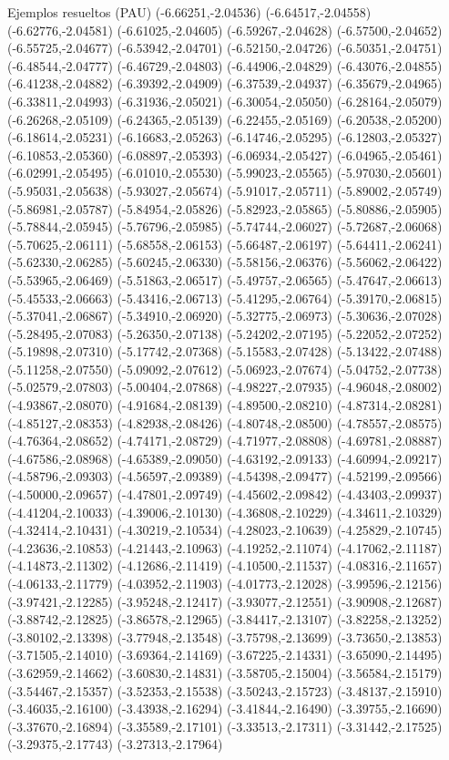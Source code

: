 \documentclass[11pt,a4paper]{article}
\begin{document}
\begin{fmex}{Ejemplos resueltos (PAU)}
(-6.66251,-2.04536) (-6.64517,-2.04558) (-6.62776,-2.04581) (-6.61025,-2.04605) (-6.59267,-2.04628) (-6.57500,-2.04652) (-6.55725,-2.04677) (-6.53942,-2.04701) (-6.52150,-2.04726) (-6.50351,-2.04751) (-6.48544,-2.04777) (-6.46729,-2.04803) (-6.44906,-2.04829) (-6.43076,-2.04855) (-6.41238,-2.04882) (-6.39392,-2.04909) (-6.37539,-2.04937) (-6.35679,-2.04965) (-6.33811,-2.04993) (-6.31936,-2.05021) (-6.30054,-2.05050) (-6.28164,-2.05079) (-6.26268,-2.05109) (-6.24365,-2.05139) (-6.22455,-2.05169) (-6.20538,-2.05200) (-6.18614,-2.05231) (-6.16683,-2.05263) (-6.14746,-2.05295) (-6.12803,-2.05327) (-6.10853,-2.05360) (-6.08897,-2.05393) (-6.06934,-2.05427) (-6.04965,-2.05461) (-6.02991,-2.05495) (-6.01010,-2.05530) (-5.99023,-2.05565) (-5.97030,-2.05601) (-5.95031,-2.05638) (-5.93027,-2.05674) (-5.91017,-2.05711) (-5.89002,-2.05749) (-5.86981,-2.05787) (-5.84954,-2.05826) (-5.82923,-2.05865) (-5.80886,-2.05905) (-5.78844,-2.05945) (-5.76796,-2.05985) (-5.74744,-2.06027) (-5.72687,-2.06068) (-5.70625,-2.06111) (-5.68558,-2.06153) (-5.66487,-2.06197) (-5.64411,-2.06241) (-5.62330,-2.06285) (-5.60245,-2.06330) (-5.58156,-2.06376) (-5.56062,-2.06422) (-5.53965,-2.06469) (-5.51863,-2.06517) (-5.49757,-2.06565) (-5.47647,-2.06613) (-5.45533,-2.06663) (-5.43416,-2.06713) (-5.41295,-2.06764) (-5.39170,-2.06815) (-5.37041,-2.06867) (-5.34910,-2.06920) (-5.32775,-2.06973) (-5.30636,-2.07028) (-5.28495,-2.07083) (-5.26350,-2.07138) (-5.24202,-2.07195) (-5.22052,-2.07252) (-5.19898,-2.07310) (-5.17742,-2.07368) (-5.15583,-2.07428) (-5.13422,-2.07488) (-5.11258,-2.07550) (-5.09092,-2.07612) (-5.06923,-2.07674) (-5.04752,-2.07738) (-5.02579,-2.07803) (-5.00404,-2.07868) (-4.98227,-2.07935) (-4.96048,-2.08002) (-4.93867,-2.08070) (-4.91684,-2.08139) (-4.89500,-2.08210) (-4.87314,-2.08281) (-4.85127,-2.08353) (-4.82938,-2.08426) (-4.80748,-2.08500) (-4.78557,-2.08575) (-4.76364,-2.08652) (-4.74171,-2.08729) (-4.71977,-2.08808) (-4.69781,-2.08887) (-4.67586,-2.08968) (-4.65389,-2.09050) (-4.63192,-2.09133) (-4.60994,-2.09217) (-4.58796,-2.09303) (-4.56597,-2.09389) (-4.54398,-2.09477) (-4.52199,-2.09566) (-4.50000,-2.09657) (-4.47801,-2.09749) (-4.45602,-2.09842) (-4.43403,-2.09937) (-4.41204,-2.10033) (-4.39006,-2.10130) (-4.36808,-2.10229) (-4.34611,-2.10329) (-4.32414,-2.10431) (-4.30219,-2.10534) (-4.28023,-2.10639) (-4.25829,-2.10745) (-4.23636,-2.10853) (-4.21443,-2.10963) (-4.19252,-2.11074) (-4.17062,-2.11187) (-4.14873,-2.11302) (-4.12686,-2.11419) (-4.10500,-2.11537) (-4.08316,-2.11657) (-4.06133,-2.11779) (-4.03952,-2.11903) (-4.01773,-2.12028) (-3.99596,-2.12156) (-3.97421,-2.12285) (-3.95248,-2.12417) (-3.93077,-2.12551) (-3.90908,-2.12687) (-3.88742,-2.12825) (-3.86578,-2.12965) (-3.84417,-2.13107) (-3.82258,-2.13252) (-3.80102,-2.13398) (-3.77948,-2.13548) (-3.75798,-2.13699) (-3.73650,-2.13853) (-3.71505,-2.14010) (-3.69364,-2.14169) (-3.67225,-2.14331) (-3.65090,-2.14495) (-3.62959,-2.14662) (-3.60830,-2.14831) (-3.58705,-2.15004) (-3.56584,-2.15179) (-3.54467,-2.15357) (-3.52353,-2.15538) (-3.50243,-2.15723) (-3.48137,-2.15910) (-3.46035,-2.16100) (-3.43938,-2.16294) (-3.41844,-2.16490) (-3.39755,-2.16690) (-3.37670,-2.16894) (-3.35589,-2.17101) (-3.33513,-2.17311) (-3.31442,-2.17525) (-3.29375,-2.17743) (-3.27313,-2.17964) 
\end{fmex}
\end{document}
